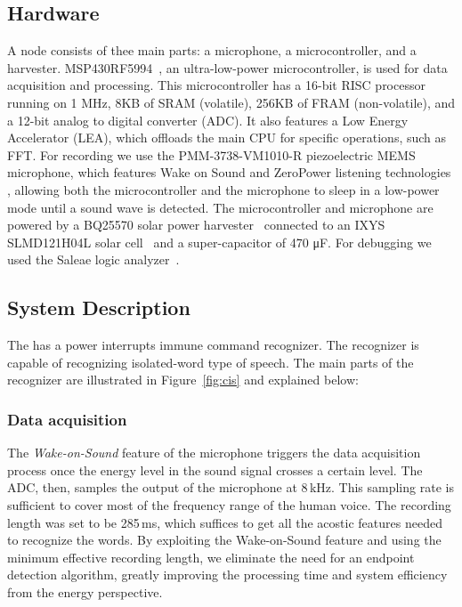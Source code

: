 \subsection{Hardware}
\label{sec:hardware}
A \cim node consists of thee main parts: a microphone, a microcontroller, and a harvester. MSP430RF5994~\cite{ti_msp430_website}, an ultra-low-power microcontroller, is used for data acquisition and processing. This microcontroller has a 16-bit RISC processor running on 1 MHz, 8KB of SRAM (volatile), 256KB of FRAM (non-volatile), and a 12-bit analog to digital converter (ADC). It also features a Low Energy Accelerator (LEA), which offloads the main CPU for specific operations, such as FFT. For recording we use the PMM-3738-VM1010-R piezoelectric MEMS microphone, which features Wake on Sound and ZeroPower listening technologies \cite{microphone}, allowing both the microcontroller and the microphone to sleep in a low-power mode until a sound wave is detected.
The microcontroller and microphone are powered by a BQ25570 solar power harvester~\cite{BQ25570EVM-206_website} connected to an IXYS SLMD121H04L solar cell~\cite{SLMD121H04L_website} and a super-capacitor of 470 \si{\micro F}. For debugging we used the Saleae logic analyzer~\cite{saleae}.

\subsection{System Description}
The \cim has a power interrupts immune command recognizer. The recognizer is capable of recognizing isolated-word type of speech. 
The main parts of the recognizer are illustrated in Figure~\ref{fig:cis} and explained below:

\subsubsection{Data acquisition}
The \textit{Wake-on-Sound} feature of the microphone triggers the data acquisition process once the energy level in the sound signal crosses a certain level. The ADC, then, samples the output of the microphone at 8\,kHz. This sampling rate is sufficient to cover most of the frequency range of the human voice. The recording length was set to be 285\,ms, which suffices to get all the acostic features needed to recognize the words.
By exploiting the Wake-on-Sound feature and using the minimum effective recording length, we eliminate the need for an endpoint detection algorithm, greatly improving the processing time and system efficiency from the energy perspective.


